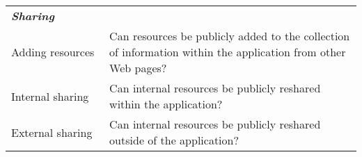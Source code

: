 \begin{table*}[htbp]
\begin{tabular}{|p{0.28\linewidth}|p{0.72\linewidth}|}
\emph{\textbf{Sharing}}            &                                                                                                           \\
Adding resources             & Can resources be publicly added to the collection of information within the application from other Web pages?     \\
Internal sharing         & Can internal resources be publicly reshared within the application?         \\ 
External sharing          & Can internal resources be publicly reshared outside of the application?         \\ 
         
\hline
\end{tabular}
\end{table*}





